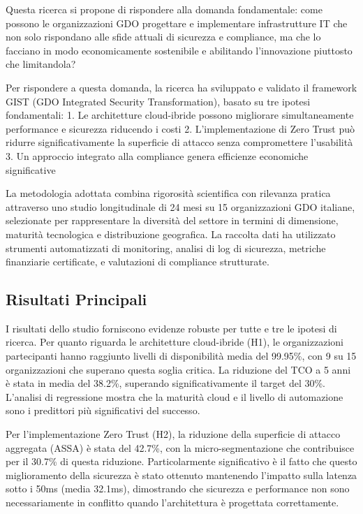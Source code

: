 \documentclass[12pt,a4paper,oneside]{book}
\numberwithin{figure}{chapter} %
\numberwithin{table}{chapter}  %
\begin{document}
Questa ricerca si propone di rispondere alla domanda fondamentale: come
possono le organizzazioni GDO progettare e implementare infrastrutture
IT che non solo rispondano alle sfide attuali di sicurezza e compliance,
ma che lo facciano in modo economicamente sostenibile e abilitando
l'innovazione piuttosto che limitandola?

Per rispondere a questa domanda, la ricerca ha sviluppato e validato il
framework GIST (GDO Integrated Security Transformation), basato su tre
ipotesi fondamentali: 1. Le architetture cloud-ibride possono migliorare
simultaneamente performance e sicurezza riducendo i costi 2.
L'implementazione di Zero Trust può ridurre significativamente la
superficie di attacco senza compromettere l'usabilità 3. Un approccio
integrato alla compliance genera efficienze economiche significative

La metodologia adottata combina rigorosità scientifica con rilevanza
pratica attraverso uno studio longitudinale di 24 mesi su 15
organizzazioni GDO italiane, selezionate per rappresentare la diversità
del settore in termini di dimensione, maturità tecnologica e
distribuzione geografica. La raccolta dati ha utilizzato strumenti
automatizzati di monitoring, analisi di log di sicurezza, metriche
finanziarie certificate, e valutazioni di compliance strutturate.

\subsection{Risultati Principali}\label{risultati-principali}

I risultati dello studio forniscono evidenze robuste per tutte e tre le
ipotesi di ricerca. Per quanto riguarda le architetture cloud-ibride
(H1), le organizzazioni partecipanti hanno raggiunto livelli di
disponibilità media del 99.95\%, con 9 su 15 organizzazioni che superano
questa soglia critica. La riduzione del TCO a 5 anni è stata in media
del 38.2\%, superando significativamente il target del 30\%. L'analisi
di regressione mostra che la maturità cloud e il livello di automazione
sono i predittori più significativi del successo.

Per l'implementazione Zero Trust (H2), la riduzione della superficie di
attacco aggregata (ASSA) è stata del 42.7\%, con la micro-segmentazione
che contribuisce per il 30.7\% di questa riduzione. Particolarmente
significativo è il fatto che questo miglioramento della sicurezza è
stato ottenuto mantenendo l'impatto sulla latenza sotto i 50ms (media
32.1ms), dimostrando che sicurezza e performance non sono
necessariamente in conflitto quando l'architettura è progettata
correttamente.
\end{document}
